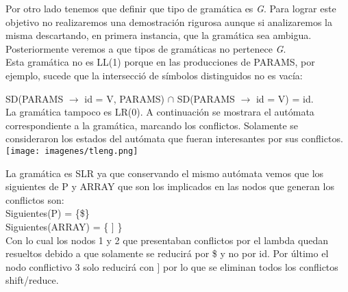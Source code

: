 Por otro lado tenemos que definir que tipo de gramática es \textit{G}. Para lograr este objetivo no realizaremos una demostración rigurosa
aunque si analizaremos la misma descartando, en primera instancia, que la gramática sea ambigua. Posteriormente veremos a que tipos de gramáticas no pertenece \textit{G}.\\

Esta gramática no es LL(1) porque en las producciones de PARAMS, por ejemplo, sucede que la intersecci\'o de s\'imbolos distinguidos no es vac\'ia: 

SD(PARAMS $\rightarrow$ id = V, PARAMS) $\cap$ SD(PARAMS $\rightarrow$ id = V) = {id}.\\

La gramática tampoco es LR(0). A continuación se mostrara el autómata correspondiente a la gramática, marcando los conflictos.
Solamente se consideraron los estados del autómata que fueran interesantes por sus conflictos.\\

\texttt{[image: imagenes/tleng.png]}


La gramática es SLR ya que conservando el mismo autómata vemos que los siguientes de P y ARRAY que son los implicados en
las nodos que generan los conflictos son:\\

Siguientes(P) = \{\$\}\\
Siguientes(ARRAY) = \{ ] \}\\

Con lo cual los nodos 1 y 2 que presentaban conflictos por el lambda quedan resueltos debido a que solamente se reducirá por
\$ y no por id. Por último el nodo conflictivo 3 solo reducirá con ] por lo que se eliminan todos los conflictos shift/reduce.
